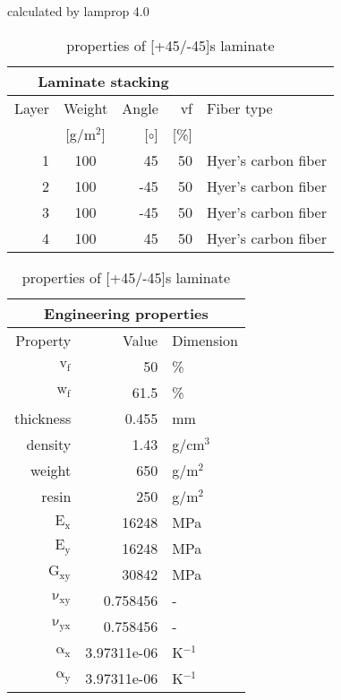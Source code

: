 \begin{table}[!htbp]
  \renewcommand{\arraystretch}{1.2}
  \caption{\label{tab:[+45/-45]s laminate}properties of [+45/-45]s laminate}
  \centering\footnotesize{\rule{0pt}{10pt}
  \tiny calculated by lamprop 4.0\\[3pt]}
    \begin{tabular}[t]{rcrrl}
      \multicolumn{4}{c}{\small\textbf{Laminate stacking}}\\[0.1em]
      \toprule %
      Layer & Weight & Angle & vf & Fiber type\\
            & [g/m$^2$] & [$\circ$] & [\%]\\
      \midrule
      1 &  100 &    45 & 50 & Hyer's carbon fiber\\
      2 &  100 &   -45 & 50 & Hyer's carbon fiber\\
      3 &  100 &   -45 & 50 & Hyer's carbon fiber\\
      4 &  100 &    45 & 50 & Hyer's carbon fiber\\
      \bottomrule
    \end{tabular}\hspace{0.02\textwidth}
    \begin{tabular}[t]{rrl}
      \multicolumn{3}{c}{\small\textbf{Engineering properties}}\\[0.1em]
      \toprule
      Property & Value & Dimension\\
      \midrule
      $\mathrm{v_f}$ & 50 &\%\\
      $\mathrm{w_f}$ & 61.5 &\%\\
      thickness & 0.455 & mm\\
      density & 1.43 & g/cm$^3$\\
      weight & 650 & g/m$^2$\\
      resin & 250 & g/m$^2$\\
      \midrule
      $\mathrm{E_x}$ &    16248 & MPa\\
      $\mathrm{E_y}$ &    16248 & MPa\\
      $\mathrm{G_{xy}}$ &    30842 & MPa\\
      $\mathrm{\nu_{xy}}$ & 0.758456 &-\\
      $\mathrm{\nu_{yx}}$ & 0.758456 &-\\
      $\mathrm{\alpha_x}$ & 3.97311e-06 & K$^{-1}$\\
      $\mathrm{\alpha_y}$ & 3.97311e-06 & K$^{-1}$\\
      \bottomrule
    \end{tabular}

\end{table}
